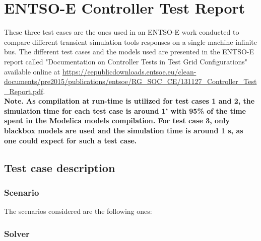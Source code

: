\documentclass[a4paper, 12pt]{report}
\begin{document}
\chapter{ENTSO-E Controller Test Report}

These three test cases are the ones used in an ENTSO-E work conducted to compare different transient simulation tools responses on a single machine infinite bus. The different test cases and the models used are presented in the ENTSO-E report called "Documentation on Controller Tests in Test Grid Configurations" available online at \url{https://eepublicdownloads.entsoe.eu/clean-documents/pre2015/publications/entsoe/RG_SOC_CE/131127_Controller_Test_Report.pdf}.\\

\textbf{Note. As compilation at run-time is utilized for test cases 1 and 2, the simulation time for each test case is around 1' with 95\% of the time spent in the Modelica models compilation. For test case 3, only blackbox models are used and the simulation time is around 1 s, as one could expect for such a test case.}

\section{Test case description}

\subsection{Scenario}

The scenarios considered are the following ones:

\begin{center}
\end{center}

\subsection{Solver}
\end{document}

